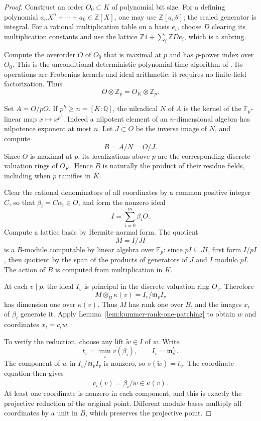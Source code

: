 \documentclass[11pt]{article}
\theoremstyle{definition}
\theoremstyle{remark}
\begin{document}
\begin{proof}
Construct an order \(O_0\subset K\) of polynomial bit size.
For a defining polynomial
\(a_nX^n+\cdots+a_0\in\mathbb Z[X]\), one may use
\(\mathbb Z[a_n\theta]\); the scaled generator is integral.
For a rational multiplication table on a basis \(e_i\), choose
\(D\) clearing its multiplication constants and use the lattice
\(\mathbb Z1+\sum_i\mathbb ZDe_i\), which is a subring.

Compute the overorder \(O\) of \(O_0\) that is maximal at
\(p\) and has \(p\)-power index over \(O_0\). This is the
unconditional deterministic polynomial-time algorithm of
\citet[Algorithm~6.1 and Proposition~6.2, pp.~246--247]
{BuchmannLenstra1994}. Its operations are Frobenius kernels and
ideal arithmetic; it requires no finite-field factorization.
Thus
\[
 O\otimes\mathbb Z_p=O_K\otimes\mathbb Z_p.
\]

Set \(A=O/pO\). If \(p^h\geq n=[K:\mathbb Q]\), the
nilradical \(N\) of \(A\) is the kernel of the
\(\mathbb F_p\)-linear map \(x\mapsto x^{p^h}\).
Indeed a nilpotent element of an \(n\)-dimensional algebra has
nilpotence exponent at most \(n\). Let \(J\subset O\) be the
inverse image of \(N\), and compute
\[
 B=A/N=O/J.
\]
Since \(O\) is maximal at \(p\), its localizations above
\(p\) are the corresponding discrete valuation rings of
\(O_K\). Hence \(B\) is naturally the product of their residue
fields, including when \(p\) ramifies in \(K\).

Clear the rational denominators of all coordinates by a common
positive integer \(C\), so that \(\beta_i=C\alpha_i\in O\),
and form the nonzero ideal
\[
 I=\sum_{i=0}^{m}\beta_iO.
\]
Compute a lattice basis by Hermite normal form. The quotient
\[
 M=I/JI
\]
is a \(B\)-module computable by linear algebra over
\(\mathbb F_p\): since \(pI\subseteq JI\), first form
\(I/pI\), then quotient by the span of the products of
generators of \(J\) and \(I\) modulo \(pI\).
The action of \(B\) is computed from multiplication in \(K\).

At each \(v\mid p\), the ideal \(I_v\) is principal in the
discrete valuation ring \(O_v\). Therefore
\[
 M\otimes_B\kappa(v)=I_v/\mathfrak m_vI_v
\]
has dimension one over \(\kappa(v)\). Thus \(M\) has rank
one over \(B\), and the images \(x_i\) of \(\beta_i\)
generate it. Apply Lemma~\ref{lem:kummer-rank-one-patching} to
obtain \(w\) and coordinates \(x_i=c_iw\).

To verify the reduction, choose any lift \(\widetilde w\in I\)
of \(w\). Write
\[
 t_v=\min_i v(\beta_i),\qquad
 I_v=\mathfrak m_v^{t_v}.
\]
The component of \(w\) in
\(I_v/\mathfrak m_vI_v\) is nonzero, so
\(v(\widetilde w)=t_v\). The coordinate equation then gives
\[
 c_i(v)=\overline{\beta_i/\widetilde w}\in\kappa(v).
\]
At least one coordinate is nonzero in each component, and this
is exactly the projective reduction of the original point.
Different module bases multiply all coordinates by a unit in
\(B\), which preserves the projective point.


\end{proof}
\end{document}
